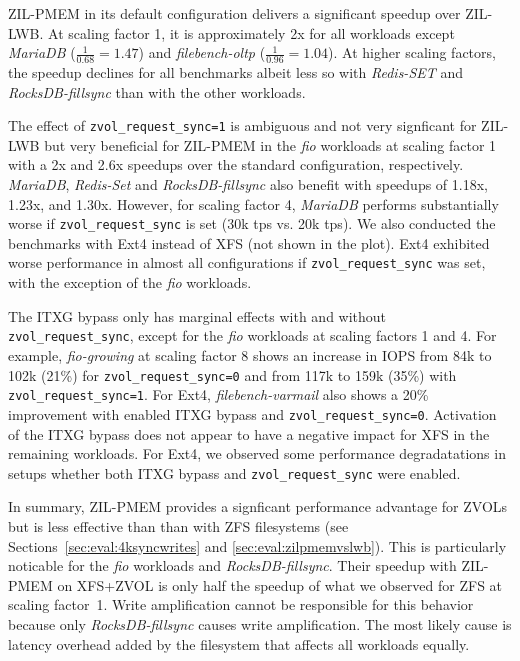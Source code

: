 \documentclass[12pt,a4paper,twoside]{book}
\begin{document}
ZIL-PMEM in its default configuration delivers a significant speedup over ZIL-LWB.
At scaling factor 1, it is approximately 2x for all workloads except \textit{MariaDB} ($\frac{1}{0.68} = 1.47$) and \textit{filebench-oltp} ($\frac{1}{0.96} = 1.04$).
At higher scaling factors, the speedup declines for all benchmarks albeit less so with \textit{Redis-SET} and \textit{RocksDB-fillsync} than with the other workloads.

The effect of \lstinline{zvol_request_sync=1} is ambiguous and not very signficant for ZIL-LWB but very beneficial for ZIL-PMEM in the \textit{fio} workloads at scaling factor 1 with a 2x and 2.6x speedups over the standard configuration, respectively.
\textit{MariaDB}, \textit{Redis-Set} and \textit{RocksDB-fillsync} also benefit with speedups of 1.18x, 1.23x, and 1.30x.
However, for scaling factor 4, \textit{MariaDB} performs substantially worse if \lstinline{zvol_request_sync} is set (30k tps vs. 20k tps).
We also conducted the benchmarks with Ext4 instead of XFS (not shown in the plot).
Ext4 exhibited worse performance in almost all configurations if \lstinline{zvol_request_sync} was set, with the exception of the \textit{fio} workloads.

The ITXG bypass only has marginal effects with and without \lstinline{zvol_request_sync}, except for the \textit{fio} workloads at scaling factors 1 and 4.
For example, \textit{fio-growing} at scaling factor 8 shows an increase in IOPS from 84k to 102k (21\%) for \lstinline{zvol_request_sync=0} and from 117k to 159k (35\%) with \lstinline{zvol_request_sync=1}.
For Ext4, \textit{filebench-varmail} also shows a 20\% improvement with enabled ITXG bypass and \lstinline{zvol_request_sync=0}.
Activation of the ITXG bypass does not appear to have a negative impact for XFS in the remaining workloads.
For Ext4, we observed some performance degradatations in setups whether both ITXG bypass and \lstinline{zvol_request_sync} were enabled.

In summary, ZIL-PMEM provides a signficant performance advantage for ZVOLs but is less effective than than with ZFS filesystems (see Sections~\ref{sec:eval:4ksyncwrites} and \ref{sec:eval:zilpmemvslwb}).
This is particularly noticable for the \textit{fio} workloads and \textit{RocksDB-fillsync}.
Their speedup with ZIL-PMEM on XFS+ZVOL is only half the speedup of what we observed for ZFS at scaling factor~1.
Write amplification cannot be responsible for this behavior because only \textit{RocksDB-fillsync} causes write amplification.
The most likely cause is latency overhead added by the filesystem that affects all workloads equally.
\end{document}
